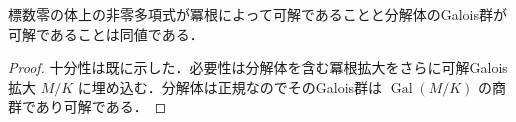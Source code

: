 \begin{prop}[Galois群による可解性の判定]
標数零の体上の非零多項式が冪根によって可解であることと分解体のGalois群が可解であることは同値である．
\end{prop}
\begin{proof}
十分性は既に示した．必要性は分解体を含む冪根拡大をさらに可解Galois拡大 $M/K$ に埋め込む．分解体は正規なのでそのGalois群は $\operatorname{Gal}(M/K)$ の商群であり可解である．
\end{proof}
